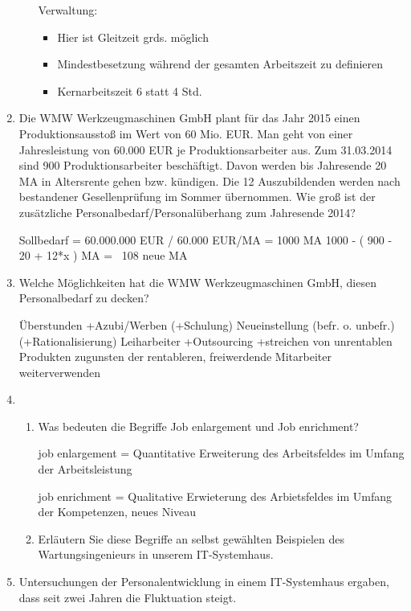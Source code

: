 \documentclass[12pt,a4paper]{scrreprt}
\begin{document}
\begin{enumerate}
\begin{enumerate}
Verwaltung:
\begin{itemize}
\item Hier ist Gleitzeit grds. möglich
\item Mindestbesetzung während der gesamten Arbeitszeit zu definieren
\item Kernarbeitszeit 6 statt 4 Std.
\end{itemize}

\end{enumerate}

\item
Die WMW Werkzeugmaschinen GmbH plant für das Jahr 2015 einen Produktionsausstoß im Wert von
60 Mio. EUR. Man geht von einer Jahresleistung von 60.000 EUR je Produktionsarbeiter aus. Zum
31.03.2014 sind 900 Produktionsarbeiter beschäftigt. Davon werden bis Jahresende 20 MA in
Altersrente gehen bzw. kündigen. Die 12 Auszubildenden werden nach bestandener Gesellenprüfung im
Sommer übernommen. Wie groß ist der zusätzliche Personalbedarf/Personalüberhang zum Jahresende 2014?

Sollbedarf = 60.000.000 EUR / 60.000 EUR/MA  = 1000 MA
1000 - ( 900 - 20 + 12*x ) MA = ~108 neue MA

\item
Welche Möglichkeiten hat die WMW Werkzeugmaschinen GmbH, diesen Personalbedarf zu decken?

Überstunden
+Azubi/Werben
(+Schulung)
Neueinstellung (befr. o. unbefr.)
(+Rationalisierung)
Leiharbeiter
+Outsourcing
+streichen von unrentablen Produkten zugunsten der rentableren, freiwerdende Mitarbeiter weiterverwenden

\item

\begin{enumerate}
\item Was bedeuten die Begriffe Job enlargement und Job enrichment?

job enlargement
= Quantitative Erweiterung des Arbeitsfeldes im Umfang der Arbeitsleistung

job enrichment
= Qualitative Erwieterung des Arbietsfeldes im Umfang der Kompetenzen, neues Niveau

\item Erläutern Sie diese Begriffe an selbst gewählten Beispielen des Wartungsingenieurs in unserem
IT-Systemhaus.
\end{enumerate}

\item
Untersuchungen der Personalentwicklung in einem IT-Systemhaus ergaben, dass seit zwei Jahren die Fluktuation steigt.


\end{enumerate}
\end{document}

